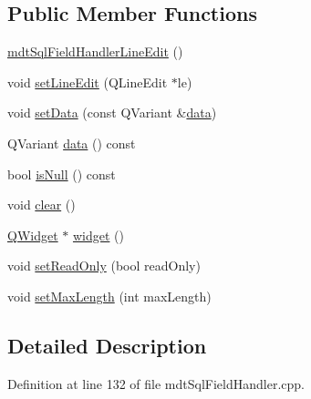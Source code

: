 \subsection*{Public Member Functions}
\begin{DoxyCompactItemize}
\item 
\hyperlink{classmdt_sql_field_handler_line_edit_a141328a067ae9ee08531cb5c0689439a}{mdt\-Sql\-Field\-Handler\-Line\-Edit} ()
\item 
void \hyperlink{classmdt_sql_field_handler_line_edit_a2b4477f48226a6e69faf3e3040da63b1}{set\-Line\-Edit} (Q\-Line\-Edit $\ast$le)
\item 
void \hyperlink{classmdt_sql_field_handler_line_edit_aabd6a72556f2389b9ea8cac1d26c0479}{set\-Data} (const Q\-Variant \&\hyperlink{classmdt_sql_field_handler_line_edit_a0c6a7f100ecadc373c55d2c590044da4}{data})
\item 
Q\-Variant \hyperlink{classmdt_sql_field_handler_line_edit_a0c6a7f100ecadc373c55d2c590044da4}{data} () const 
\item 
bool \hyperlink{classmdt_sql_field_handler_line_edit_ad492eab28cb88bfe623ec3af04aeeb1f}{is\-Null} () const 
\item 
void \hyperlink{classmdt_sql_field_handler_line_edit_ad41a3af3230333d74ac688a5e91354b4}{clear} ()
\item 
\hyperlink{class_q_widget}{Q\-Widget} $\ast$ \hyperlink{classmdt_sql_field_handler_line_edit_a475426ca27aea03d01f31c7d9c8bb5ba}{widget} ()
\item 
void \hyperlink{classmdt_sql_field_handler_line_edit_ab282e2ce51a42e55286111089526b6bb}{set\-Read\-Only} (bool read\-Only)
\item 
void \hyperlink{classmdt_sql_field_handler_line_edit_a5a7599a112fd4d74ff0d50cb72e5998c}{set\-Max\-Length} (int max\-Length)
\end{DoxyCompactItemize}


\subsection{Detailed Description}


Definition at line 132 of file mdt\-Sql\-Field\-Handler.\-cpp.



